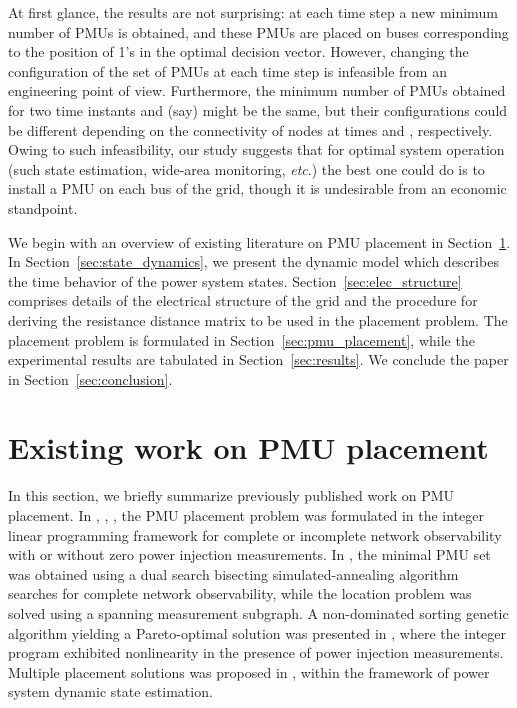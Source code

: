 \documentclass[10pt,journal,twocolumn]{IEEEtran}\IEEEoverridecommandlockouts
\newcommand{\etc}{{\em etc}}
\newcommand{\secref}[1]{Section~\ref{#1}}
\begin{document}
At first glance, the results are not surprising: at each time step a new minimum number of PMUs is obtained, and these PMUs are placed on buses corresponding to the position of 1's in the optimal decision vector. However, changing the configuration of the set of PMUs at each time step is infeasible from an engineering point of view. Furthermore, the minimum number of PMUs obtained for two time instants  and  (say) might be the same, but their configurations could be different depending on the connectivity of nodes at times  and , respectively. Owing to such infeasibility, our study suggests that for optimal system operation (such state estimation, wide-area monitoring, {\etc}.) the best one could do is to install a PMU on each bus of the grid, though it is undesirable from an economic standpoint.

We begin with an overview of existing literature on PMU placement in \secref{sec:relatedwork}. In \secref{sec:state_dynamics}, we present the dynamic model which describes the time behavior of the power system states. \secref{sec:elec_structure} comprises details of the electrical structure of the grid and the procedure for deriving the resistance distance matrix to be used in the placement problem. The placement problem is formulated in \secref{sec:pmu_placement}, while the experimental results are tabulated in \secref{sec:results}. We conclude the paper in \secref{sec:conclusion}.

\section{Existing work on PMU placement}\label{sec:relatedwork}
In this section, we briefly summarize previously published work on PMU placement. In \cite{Nuqui2005}, \cite{Gou2008}, \cite{Gou2008a}, the PMU placement problem was formulated in the integer linear  programming framework for complete or incomplete network observability with or without zero power injection measurements. In \cite{Baldwin1993}, the minimal PMU set was obtained using a dual search bisecting simulated-annealing algorithm searches for complete network observability, while the location problem was solved using a spanning measurement subgraph. A non-dominated sorting genetic algorithm yielding a Pareto-optimal solution was presented in \cite{Milosevic2003}, where the integer program exhibited nonlinearity in the presence of power injection measurements. Multiple placement solutions was proposed in \cite{Zhang2010}, within the framework of power system dynamic state estimation.
\end{document}
